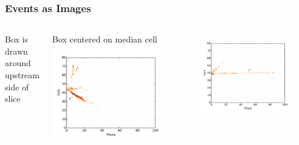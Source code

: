 \documentclass[10pt,professionalfonts,xcolor=table]{beamer}
\begin{document}
\begin{frame}
\frametitle{\nova Events as Images}

\begin{columns}[b]

\bangon
\item Box is drawn around upstream side of slice
\item Box centered on median cell
\bangoff
\vspace{30pt}
\centering
\includegraphics[width=0.85\textwidth]{figures/cnn/view_truetype6_caltype6_event155_y.pdf}


\centering
\includegraphics[width=0.85\textwidth]{figures/cnn/view_truetype2_caltype2_event274_x.pdf}

\vspace{-5pt}



\end{columns}
\end{frame}
\end{document}

